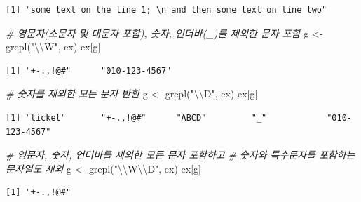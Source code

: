 \documentclass[
  11pt,
]{krantz}
\newenvironment{Shaded}{\begin{snugshade}}{\end{snugshade}}
\newcommand{\CommentTok}[1]{\textcolor[rgb]{0.37,0.37,0.37}{\textit{#1}}}
\newcommand{\DocumentationTok}[1]{\textcolor[rgb]{0.37,0.37,0.37}{\textbf{\textit{#1}}}}
\newcommand{\FunctionTok}[1]{\textcolor[rgb]{0,0,0}{#1}}
\newcommand{\NormalTok}[1]{#1}
\newcommand{\OtherTok}[1]{\textcolor[rgb]{0.37,0.37,0.37}{#1}}
\newcommand{\SpecialCharTok}[1]{\textcolor[rgb]{0,0,0}{#1}}
\newcommand{\StringTok}[1]{\textcolor[rgb]{0.5,0.5,0.5}{#1}}
\begin{document}
\begin{verbatim}
[1] "some text on the line 1; \n and then some text on line two"
\end{verbatim}

\begin{Shaded}
\begin{Highlighting}[]
\CommentTok{\# 영문자(소문자 및 대문자 포함), 숫자, 언더바(\_)를 제외한 문자 포함 }
\NormalTok{g }\OtherTok{\textless{}{-}} \FunctionTok{grepl}\NormalTok{(}\StringTok{"}\SpecialCharTok{\textbackslash{}\textbackslash{}}\StringTok{W"}\NormalTok{, ex)}
\NormalTok{ex[g]}
\end{Highlighting}
\end{Shaded}

\begin{verbatim}
[1] "+-.,!@#"      "010-123-4567"
\end{verbatim}

\begin{Shaded}
\begin{Highlighting}[]
\CommentTok{\# 숫자를 제외한 모든 문자 반환}
\NormalTok{g }\OtherTok{\textless{}{-}} \FunctionTok{grepl}\NormalTok{(}\StringTok{"}\SpecialCharTok{\textbackslash{}\textbackslash{}}\StringTok{D"}\NormalTok{, ex)}
\NormalTok{ex[g]}
\end{Highlighting}
\end{Shaded}

\begin{verbatim}
[1] "ticket"       "+-.,!@#"      "ABCD"         "_"            "010-123-4567"
\end{verbatim}

\begin{Shaded}
\begin{Highlighting}[]
\CommentTok{\# 영문자, 숫자, 언더바를 제외한 모든 문자 포함하고}
\CommentTok{\# 숫자와 특수문자를 포함하는 문자열도 제외}
\NormalTok{g }\OtherTok{\textless{}{-}} \FunctionTok{grepl}\NormalTok{(}\StringTok{"}\SpecialCharTok{\textbackslash{}\textbackslash{}}\StringTok{W}\SpecialCharTok{\textbackslash{}\textbackslash{}}\StringTok{D"}\NormalTok{, ex)}
\NormalTok{ex[g]}
\end{Highlighting}
\end{Shaded}

\begin{verbatim}
[1] "+-.,!@#"
\end{verbatim}

\begin{Shaded}
\end{Shaded}
\end{document}
